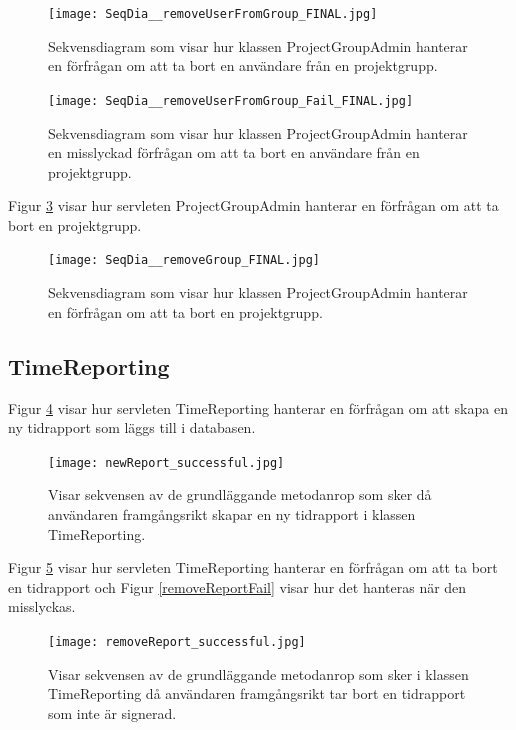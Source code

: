 \documentclass[a4paper]{article}
\begin{document}
\begin{figure}[h!]
\centering
\texttt{[image: SeqDia\_\_removeUserFromGroup\_FINAL.jpg]}
\caption{Sekvensdiagram som visar hur klassen ProjectGroupAdmin hanterar en förfrågan om att ta bort en användare från en projektgrupp.
\label{removeUserFromGroup}}
\end{figure}

\begin{figure}[h!]
\centering
\texttt{[image: SeqDia\_\_removeUserFromGroup\_Fail\_FINAL.jpg]}
\caption{Sekvensdiagram som visar hur klassen ProjectGroupAdmin hanterar en misslyckad förfrågan om att ta bort en användare från en projektgrupp.
\label{removeUserFromGroupFail}}
\end{figure}

\noindent
Figur \ref{removeGroup} visar hur servleten ProjectGroupAdmin hanterar en förfrågan om att ta bort en projektgrupp.

\begin{figure}[h!]
\centering
\texttt{[image: SeqDia\_\_removeGroup\_FINAL.jpg]}
\caption{Sekvensdiagram som visar hur klassen ProjectGroupAdmin hanterar en förfrågan om att ta bort en projektgrupp.
\label{removeGroup}}
\end{figure}

\subsection{TimeReporting}
Figur \ref{newReport} visar hur servleten TimeReporting hanterar en förfrågan om att skapa en ny tidrapport som läggs till i databasen.

\begin{figure}[h!]
\centering
\texttt{[image: newReport\_successful.jpg]}
\caption{Visar sekvensen av de grundläggande metodanrop som sker då användaren framgångsrikt skapar en ny tidrapport i klassen TimeReporting.
\label{newReport}}
\end{figure}

\noindent
Figur \ref{removeReport} visar hur servleten TimeReporting hanterar en förfrågan om att ta bort en tidrapport och Figur \ref{removeReportFail} visar hur det hanteras när den misslyckas.

\begin{figure}[h!]
\centering
\texttt{[image: removeReport\_successful.jpg]}
\caption{Visar sekvensen av de grundläggande metodanrop som sker i klassen TimeReporting då användaren framgångsrikt tar bort en tidrapport som inte är signerad.
\label{removeReport}}
\end{figure}
\end{document}
